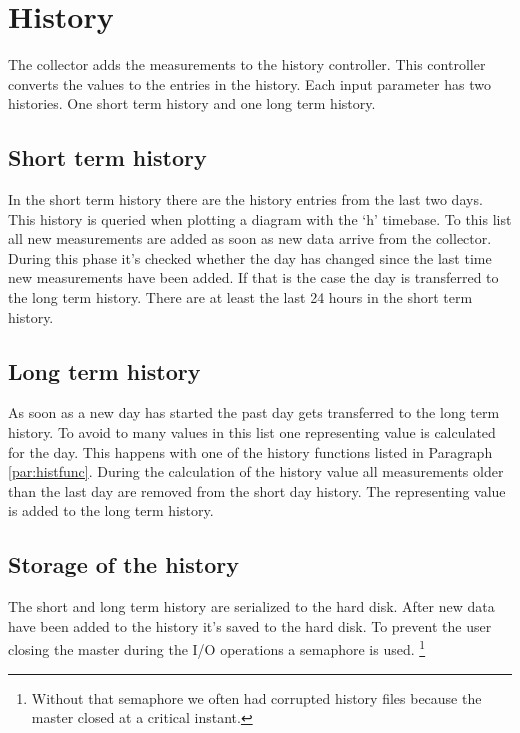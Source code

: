 {\C  }


\section{History} %
\label{sec:history}
The collector adds the measurements to the history controller. This controller converts the values to the entries in the history. Each input parameter has two histories. One short term history and one long term history. 
\subsection{Short term history} %
\label{sub:short_term_history}
In the short term history there are the history entries from the last two days. This history is queried when plotting a diagram with the `h' timebase. To this list all new measurements are added as soon as new data arrive from the collector. During this phase it's checked whether the day has changed since the last time new measurements have been added. If that is the case the day is transferred to the long term history. There are at least the last 24 hours in the short term history.

\subsection{Long term history} %
\label{ssub:long_term_history}
As soon as a new day has started the past day gets transferred to the long term history. To avoid to many values in this list one representing value is calculated for the day. This happens with one of the history functions listed in Paragraph \ref{par:histfunc}. During the calculation of the history value all measurements older than the last day are removed from the short day history. The representing value is added to the long term history.

\subsection{Storage of the history} %
\label{sub:storage_of_the_history}
The short and long term history are serialized to the hard disk. After new data have been added to the history it's saved to the hard disk. To prevent the user closing the master during the I/O operations a semaphore is used. \footnote{Without that semaphore we often had corrupted history files because the master closed at a critical instant.}

